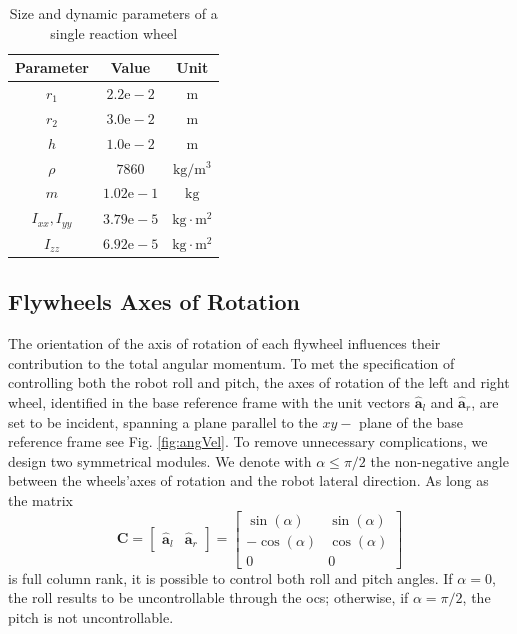 \documentclass[journal,letterpaper]{IEEEtran}
\begin{document}
\begin{table}
	\centering
	\begin{tabular}{ccc}
		Parameter & Value & Unit \\
		\hline
		\hline
		$r_1$ & $2.2\mathrm{e}-2$ & $\mathrm{m}$ \\
		$r_2$ & $3.0\mathrm{e}-2$ & $\mathrm{m}$ \\
		$h$   & $1.0\mathrm{e}-2$ & $\mathrm{m}$ \\
		$\rho$   & $7860$ & $\mathrm{kg/m^3}$ \\
		$m$   & $1.02\mathrm{e}-1$ & $\mathrm{kg}$ \\
		$I_{xx}, I_{yy}$   & $3.79 \mathrm{e}-5$ & $\mathrm{kg \cdot m^2}$ \\
		$I_{zz}$   & $6.92 \mathrm{e}-5$ & $ \mathrm{kg \cdot m^2}$ \\
	\end{tabular}
	\caption{Size and dynamic parameters of a single reaction wheel}
	\label{tab:dim_fw}
\end{table}

\subsection{Flywheels Axes of Rotation}
The orientation of the axis of rotation of each flywheel influences their contribution to the total angular momentum. To met the specification of controlling both the robot roll and pitch, the axes of rotation of the left and right wheel, identified in the base reference frame with the unit vectors $\hat{\bm{a}}_l$ and $\hat{\bm{a}}_r$, are set to be incident, spanning a plane parallel to the $xy-$ plane of the base reference frame see Fig. \ref{fig:angVel}. 
To remove unnecessary complications, we design two symmetrical modules. We denote with $\alpha \leq \pi/2$ the non-negative angle between the wheels'axes of rotation and the robot lateral direction. As long as the matrix
\begin{equation}
\bm{C} = 
\left[ \begin{array}{cc}
\hat{\bm{a}}_l & \hat{\bm{a}}_r
\end{array} \right] = 
\left[ \begin{array}{cc}
\sin(\alpha) & \sin(\alpha) \\
-\cos(\alpha) & \cos(\alpha) \\
0 & 0
\end{array} \right]
\end{equation}
is full column rank, it is possible to control both roll and pitch angles. If $\alpha = 0$, the roll results to be uncontrollable through the \acrshort{ocs}; otherwise, if $\alpha = \pi/2$, the pitch is not uncontrollable.
\end{document}

